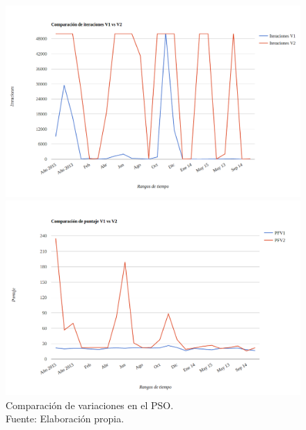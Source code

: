 \begin{figure}[ht!]
    \begin{center}
        \includegraphics[width=\textwidth]{figures/comp_v1_v2_iteraciones.png}
       
        \includegraphics[width=\textwidth]{figures/comp_v1_v2_puntaje.png}
    \end{center}    
    \caption{Comparación de variaciones en el PSO.\\ Fuente: Elaboración propia.}
    \label{fig:comparison_pso_1}
\end{figure}

